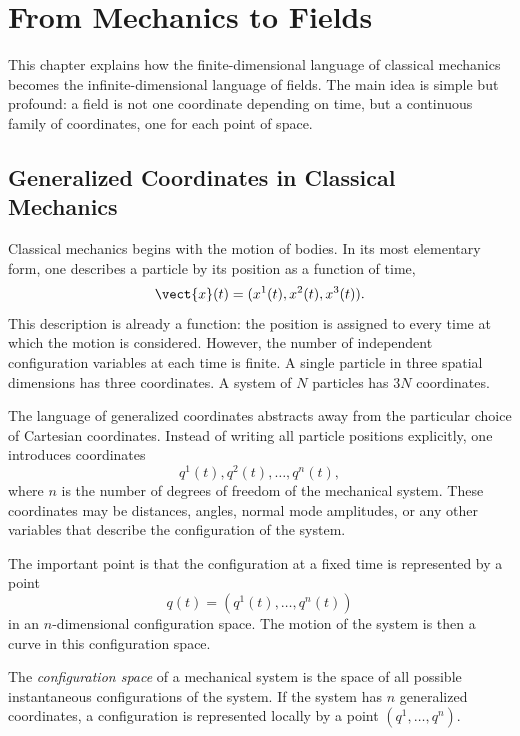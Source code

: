 \chapter{From Mechanics to Fields}

\begin{remarkbox}
This chapter explains how the finite-dimensional language of classical
mechanics becomes the infinite-dimensional language of fields. The main idea is
simple but profound: a field is not one coordinate depending on time, but a
continuous family of coordinates, one for each point of space.
\end{remarkbox}

\section{Generalized Coordinates in Classical Mechanics}

Classical mechanics begins with the motion of bodies. In its most elementary
form, one describes a particle by its position as a function of time,
\[
    \vect{x}(t) = (x^1(t),x^2(t),x^3(t)).
\]
This description is already a function: the position is assigned to every time
at which the motion is considered. However, the number of independent
configuration variables at each time is finite. A single particle in three
spatial dimensions has three coordinates. A system of \(N\) particles has
\(3N\) coordinates.

The language of generalized coordinates abstracts away from the particular
choice of Cartesian coordinates. Instead of writing all particle positions
explicitly, one introduces coordinates
\[
    q^1(t),q^2(t),\ldots,q^n(t),
\]
where \(n\) is the number of degrees of freedom of the mechanical system. These
coordinates may be distances, angles, normal mode amplitudes, or any other
variables that describe the configuration of the system.

The important point is that the configuration at a fixed time is represented by
a point
\[
    q(t) = (q^1(t),\ldots,q^n(t))
\]
in an \(n\)-dimensional configuration space. The motion of the system is then a
curve in this configuration space.

\begin{definitionbox}
The \emph{configuration space} of a mechanical system is the space of all
possible instantaneous configurations of the system. If the system has
\(n\) generalized coordinates, a configuration is represented locally by a point
\((q^1,\ldots,q^n)\).
\end{definitionbox}

